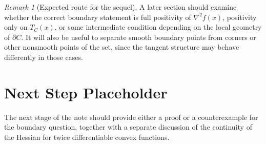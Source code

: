 \documentclass[11pt]{article}
\theoremstyle{remark}
\newtheorem{remark}{Remark}
\begin{document}
\begin{remark}[Expected route for the sequel]
A later section should examine whether the correct boundary statement is full
positivity of $\nabla^2 f(x)$, positivity only on $T_C(x)$, or some intermediate
condition depending on the local geometry of $\partial C$. It will also be useful
to separate smooth boundary points from corners or other nonsmooth points of the
set, since the tangent structure may behave differently in those cases.
\end{remark}

\section{Next Step Placeholder}

The next stage of the note should provide either a proof or a counterexample for
the boundary question, together with a separate discussion of the continuity of
the Hessian for twice differentiable convex functions.
\end{document}
